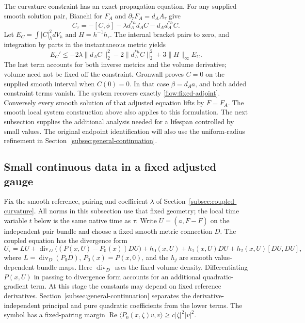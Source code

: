 \documentclass[11pt]{article}
\numberwithin{equation}{section}
\theoremstyle{definition}
\theoremstyle{remark}
\begin{document}
The curvature constraint has an exact propagation equation.
For any supplied smooth solution pair, Bianchi for $F_A$ and
$\partial_\tau F_A=d_AA_\tau$ give
\begin{equation}\label{eq:curvature-constraint}
 C_\tau=-[C,\phi]-\lambda d_A^{*h}d_AC-d_Ad_A^{*h}C.
\end{equation}
Let $E_C=\int|C|_h^2dV_h$ and $H=h^{-1}h_\tau$.
The internal bracket pairs to zero, and integration by parts
in the instantaneous metric yields
\[
 E_C'\le-2\lambda\|d_AC\|_2^2-2\|d_A^{*h}C\|_2^2
                       +3\|H\|_\infty E_C.
\]
The last term accounts for both inverse metrics and the volume
derivative; volume need not be fixed off the constraint.
Gronwall proves $C=0$ on the supplied smooth interval when
$C(0)=0$. In that case $\beta=d_Aa$, and both added constraint
terms vanish. The system recovers exactly
\eqref{flow:fixed-adjoint}. Conversely every smooth solution
of that adjusted equation lifts by $F=F_A$.
The smooth local system construction above also applies to
this formulation. The next subsection supplies the additional
analysis needed for a lifespan controlled by small values.
The original endpoint identification will also use the
uniform-radius refinement in
Section~\ref{subsec:general-continuation}.

\subsection{Small continuous data in a fixed adjusted gauge}
\label{subsec:rough-local}

Fix the smooth reference, pairing and coefficient $\lambda$ of
Section~\ref{subsec:coupled-curvature}. All norms in this subsection
use that fixed geometry; the local time variable $t$ below is
the same native time as $\tau$. Write $U=(a,F-\bar F)$ on the independent
pair bundle and choose a fixed smooth metric connection $D$.
The coupled equation has the divergence form
\begin{equation}\label{eq:rough-system}
 U_\tau=LU+\operatorname{div}_D\bigl((P(x,U)-P_0(x))DU\bigr)
       +h_0(x,U)+h_1(x,U)DU+h_2(x,U)[DU,DU],
\end{equation}
where $L=\operatorname{div}_D(P_0D)$, $P_0(x)=P(x,0)$,
and the $h_j$ are smooth value-dependent bundle maps.
Here $\operatorname{div}_D$ uses the fixed volume density.
Differentiating $P(x,U)$ in passing to divergence form accounts
for an additional quadratic-gradient term. At this stage the constants may depend on fixed reference
derivatives. Section~\ref{subsec:general-continuation} separates
the derivative-independent principal and pure quadratic
coefficients from the lower terms.
The symbol has a fixed-pairing margin
$\operatorname{Re}\langle P_0(x,\zeta)v,v\rangle
\ge c|\zeta|^2|v|^2$.
\end{document}
